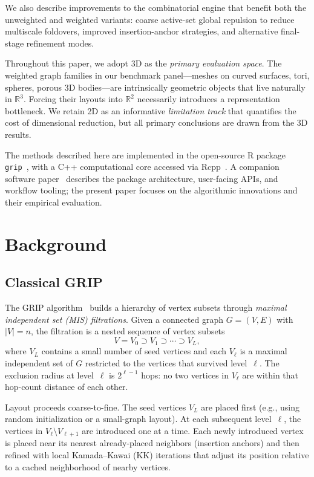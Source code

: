 \documentclass[11pt,twocolumn]{article}
\newcommand{\RR}{\mathbb{R}}
\newcommand{\grip}{\texttt{grip}}
\begin{document}
We also describe improvements to the combinatorial engine that benefit
both the unweighted and weighted variants: coarse active-set global
repulsion to reduce multiscale foldovers, improved insertion-anchor
strategies, and alternative final-stage refinement modes.

Throughout this paper, we adopt 3D as the \emph{primary evaluation
space}.  The weighted graph families in our benchmark panel---meshes on
curved surfaces, tori, spheres, porous 3D bodies---are intrinsically
geometric objects that live naturally in $\RR^3$.  Forcing their layouts
into $\RR^2$ necessarily introduces a representation bottleneck.  We
retain 2D as an informative \emph{limitation track} that quantifies the
cost of dimensional reduction, but all primary conclusions are drawn from
the 3D results.

The methods described here are implemented in the open-source R package
\grip{}~\citep{gajer2002}, with a C++ computational core accessed via
Rcpp~\citep{eddelbuettel2011}.  A companion software
paper~\citep{gripRpaper} describes the package architecture, user-facing
APIs, and workflow tooling; the present paper focuses on the algorithmic
innovations and their empirical evaluation.


\section{Background}\label{sec:background}

\subsection{Classical GRIP}

The GRIP algorithm~\citep{gajer2002,gajer2004} builds a hierarchy of
vertex subsets through \emph{maximal independent set (MIS) filtrations}.
Given a connected graph $G = (V, E)$ with $|V| = n$, the filtration is a
nested sequence of vertex subsets
\[
  V = V_0 \supset V_1 \supset \cdots \supset V_L,
\]
where $V_L$ contains a small number of seed vertices and each $V_\ell$
is a maximal independent set of $G$ restricted to the vertices that
survived level~$\ell$.  The exclusion radius at level~$\ell$ is
$2^{\ell-1}$ hops: no two vertices in $V_\ell$ are within that
hop-count distance of each other.

Layout proceeds coarse-to-fine.  The seed vertices $V_L$ are placed
first (e.g., using random initialization or a small-graph layout).  At
each subsequent level~$\ell$, the vertices in $V_{\ell} \setminus
V_{\ell+1}$ are introduced one at a time.  Each newly introduced vertex
is placed near its nearest already-placed neighbors (insertion anchors)
and then refined with local Kamada--Kawai (KK) iterations that
adjust its position relative to a cached neighborhood of nearby vertices.
\end{document}
